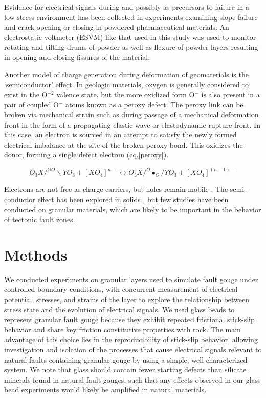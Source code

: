 Evidence for electrical signals during and possibly as precursors to failure in a low stress environment has been collected \citep{Shinbrot:2012jd} in experiments examining slope failure and crack opening or closing in powdered pharmaceutical materials.  An electrostatic voltmeter (ESVM) like that used in this study was used to monitor rotating and tilting drums of powder as well as flexure of powder layers resulting in opening and closing fissures of the material. 

Another model of charge generation during deformation of geomaterials is the `semiconductor' effect.  In geologic materials, oxygen is generally considered to exist in the O$^{-2}$ valence state, but the more oxidized form O$^-$ is also present in a pair of coupled O$^-$ atoms known as a peroxy defect.  The peroxy link can be broken via mechanical strain such as during passage of a mechanical deformation front in the form of a propagating elastic wave or elastodynamic rupture front. In this case, an electron is sourced in an attempt to satisfy the newly formed electrical imbalance at the site of the broken peroxy bond.  This oxidizes the donor, forming a single defect electron (eq.\ref{peroxy}). \citep{Freund:2000vf, Freund:2006kb,Freund:2010bl}
  
\begin{equation}
O_3 X/^{OO}\backslash YO_3 + [XO_4]^{n-} \leftrightarrow O_3X/^{O} \bullet _O/YO_3+[XO_4]^{(n-1)-}
\label{peroxy}
\end{equation}

Electrons are not free as charge carriers, but holes remain mobile \citep{Freund:2000vf,Freund:2006kb,Freund:2010bl,Balk:2009hu}. The semi-conductor effect has been explored in solids \citep{Takeuchi:2013cu,StLaurent:2006fq}, but few studies have been conducted on granular materials, which are likely to be important in the behavior of tectonic fault zones.

%
%
\section{Methods}

We conducted experiments on granular layers used to simulate fault gouge under controlled boundary conditions, with concurrent measurement of electrical potential, stresses, and strains of the layer to explore the relationship between stress state and the evolution of electrical signals.  We used glass beads to represent granular fault gouge because they exhibit repeated frictional stick-slip behavior and share key friction constitutive properties with rock. The main advantage of this choice lies in the reproducibility of stick-slip behavior, allowing investigation and isolation of the processes that cause electrical signals relevant to natural faults containing granular gouge by using a simple, well-characterized system. We note that glass should contain fewer starting defects than silicate minerals found in natural fault gouges, such that any effects observed in our glass bead experiments would likely be amplified in natural materials.

